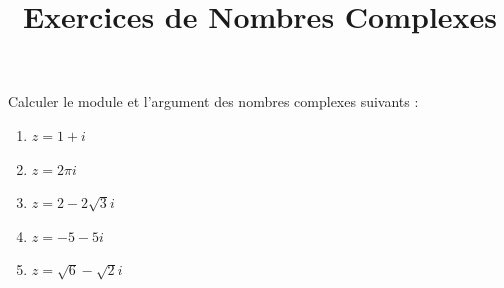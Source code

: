 \documentclass[a4paper,12pt]{article}
\title{Exercices de Nombres Complexes}
\author{}
\date{}
\begin{document}
\maketitle

\begin{tcolorbox}[title=Exercice 1 - {[}Calculer{]}]
Calculer le module et l’argument des nombres complexes suivants :
\begin{enumerate}
    \item \( z = 1 + i \)
    \item \( z = 2\pi i \)
    \item \( z = 2 - 2\sqrt{3}i \)
    \item \( z = -5 - 5i \)
    \item \( z = \sqrt{6} - \sqrt{2}i \)
\end{enumerate}
\end{tcolorbox}
\end{document}
